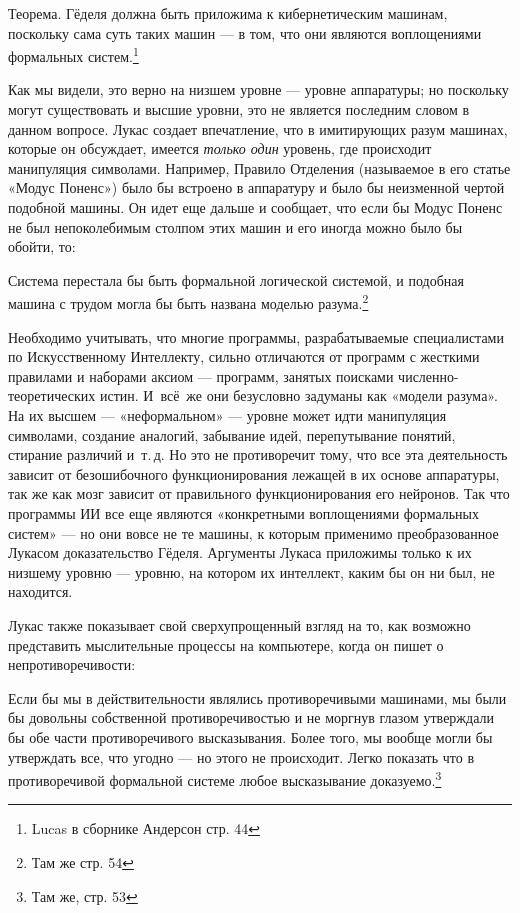 \documentclass[../main.tex]{subfiles}
\begin{document}
Теорема. Гёделя должна быть приложима к кибернетическим машинам, поскольку сама суть таких машин --- в том, что они являются воплощениями формальных систем.\footnote{Lucas в сборнике Андерсон стр. 44}

Как мы видели, это верно на низшем уровне --- уровне аппаратуры; но поскольку могут существовать и высшие уровни, это не является последним словом в данном вопросе. Лукас создает впечатление, что в имитирующих разум машинах, которые он обсуждает, имеется \emph{только один} уровень, где происходит манипуляция символами. Например, Правило Отделения (называемое в его статье «Модус Поненс») было бы встроено в аппаратуру и было бы неизменной чертой подобной машины. Он идет еще дальше и сообщает, что если бы Модус Поненс не был непоколебимым столпом этих машин и его иногда можно было бы обойти, то:

Система перестала бы быть формальной логической системой, и подобная машина с трудом могла бы быть названа моделью разума.\footnote{Там же стр. 54}

Необходимо учитывать, что многие программы, разрабатываемые специалистами по Искусственному Интеллекту, сильно отличаются от программ с жесткими правилами и наборами аксиом --- программ, занятых поисками численно-теоретических истин. И~всё~же они безусловно задуманы как «модели разума». На их высшем --- «неформальном» --- уровне может идти манипуляция символами, создание аналогий, забывание идей, перепутывание понятий, стирание различий и~т.\,д. Но это не противоречит тому, что все эта деятельность зависит от безошибочного функционирования лежащей в их основе аппаратуры, так же как мозг зависит от правильного функционирования его нейронов. Так что программы ИИ все еще являются «конкретными воплощениями формальных систем» --- но они вовсе не те машины, к которым применимо преобразованное Лукасом доказательство Гёделя. Аргументы Лукаса приложимы только к их низшему уровню --- уровню, на котором их интеллект, каким бы он ни был, не находится.

Лукас также показывает свой сверхупрощенный взгляд на то, как возможно представить мыслительные процессы на компьютере, когда он пишет о непротиворечивости:

Если бы мы в действительности являлись противоречивыми машинами, мы были бы довольны собственной противоречивостью и не моргнув глазом утверждали бы обе части противоречивого высказывания. Более того, мы вообще могли бы утверждать все, что угодно --- но этого не происходит. Легко показать что в противоречивой формальной системе любое высказывание доказуемо.\footnote{Там же, стр. 53}
\end{document}
